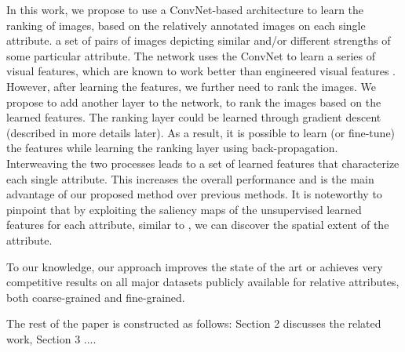 In this work, we propose to use a ConvNet-based architecture to learn the ranking of images, based on the relatively annotated images on each single attribute. a set of pairs of images depicting similar and/or different strengths of some particular attribute. The network uses the ConvNet to learn a series of visual features, which are known to work better than engineered visual features \cite{offtheshelf}. However, after learning the features, we further need to rank the images. We propose to add another layer to the network, to rank the images based on the learned features. The ranking layer could be learned through gradient descent (described in more details later). As a result, it is possible to learn (or fine-tune) the features while learning the ranking layer using back-propagation. Interweaving the two processes leads to a set of learned features that characterize each single attribute. This increases the overall performance and is the main advantage of our proposed method over previous methods. It is noteworthy to pinpoint that by exploiting the saliency maps of the unsupervised learned features for each attribute, similar to \cite{simonyan14a}, we can discover the spatial extent \cite{specialextent} of the attribute. %

To our knowledge, our approach improves the state of the art or achieves very competitive results on all major datasets publicly available for relative attributes, both coarse-grained and fine-grained.

The rest of the paper is constructed as follows: Section 2 discusses the related work, Section 3 ....